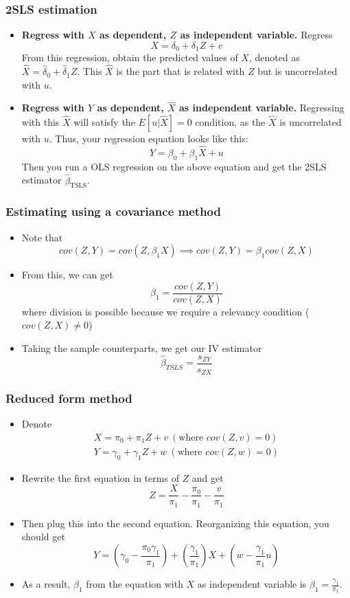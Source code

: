 \documentclass[aspectratio=169]{beamer}
\begin{document}
\begin{frame}
\frametitle{2SLS estimation}

\begin{itemize}
\item \textbf{Regress with $X$ as dependent, $Z$ as independent variable.} Regress
\[
X=\delta_0 + \delta_1Z+v
\]
From this regression, obtain the predicted values of $X$, denoted as $\hat{X}=\hat{\delta}_0+\hat{\delta}_1Z$. This $\hat{X}$ is the part that is related with $Z$ but is uncorrelated with $u$.
\item \textbf{Regress with $Y$ as dependent, $\hat{X}$ as independent variable.} Regressing with this $\hat{X}$ will satisfy the $E[u|\hat{X}]=0$ condition, as the $\hat{X}$ is uncorrelated with $u$. Thus, your regression equation looks like this:
\[
Y=\beta_0+\beta_1\hat{X}+u
\]
Then you run a OLS regression on the above equation and get the 2SLS estimator $\hat{\beta}_{\text{TSLS}}$. 

\end{itemize}
\end{frame}



\begin{frame}
\frametitle{Estimating using a covariance method}
\begin{itemize}
\item Note that
\[
cov(Z,Y)=cov(Z,\beta_1X) \implies cov(Z,Y)=\beta_1cov(Z,X)
\]
\item From this, we can get
\[
\beta_1=\frac{cov(Z,Y)}{cov(Z,X)}
\]
where division is possible because we require a relevancy condition ($cov(Z,X)\neq0$)
\item Taking the sample counterparts, we get our IV estimator
\[
\hat{\beta}_{TSLS}=\frac{s_{ZY}}{s_{ZX}}
\]
\end{itemize}
\end{frame}

\begin{frame}
\frametitle{Reduced form method}
\begin{itemize}
\item Denote 
\begin{gather*}
X=\pi_0+\pi_1Z+v \ (\text{where }cov(Z,v)=0)\\ Y=\gamma_0+\gamma_1Z+w \ (\text{where }cov(Z,w)=0)
\end{gather*}
\item Rewrite the first equation in terms of $Z$ and get
\[
Z=\frac{X}{\pi_1}-\frac{\pi_0}{\pi_1}-\frac{v}{\pi_1}
\]
\item Then plug this into the second equation. Reorganizing this equation, you should get
\[
Y=\left(\gamma_0-\frac{\pi_0\gamma_1}{\pi_1}\right)+\left(\frac{\gamma_1}{\pi_1}\right)X+\left(w-\frac{\gamma_1}{\pi_1}u\right)
\]
\item As a result, $\beta_1$ from the equation with $X$ as independent variable is $\beta_1 = \frac{\gamma_1}{\pi_1}$. 
\end{itemize}
\end{frame}
\end{document}
